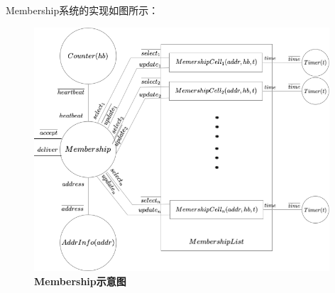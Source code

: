Membership系统的实现如图所示：
\begin{figure}[!htbp]
	\small
	\centering
	\includegraphics[width=11cm]{../figure/membership.png}
    \caption{\textbf{Membership示意图}}
    \label{fig_membership}
\end{figure}

